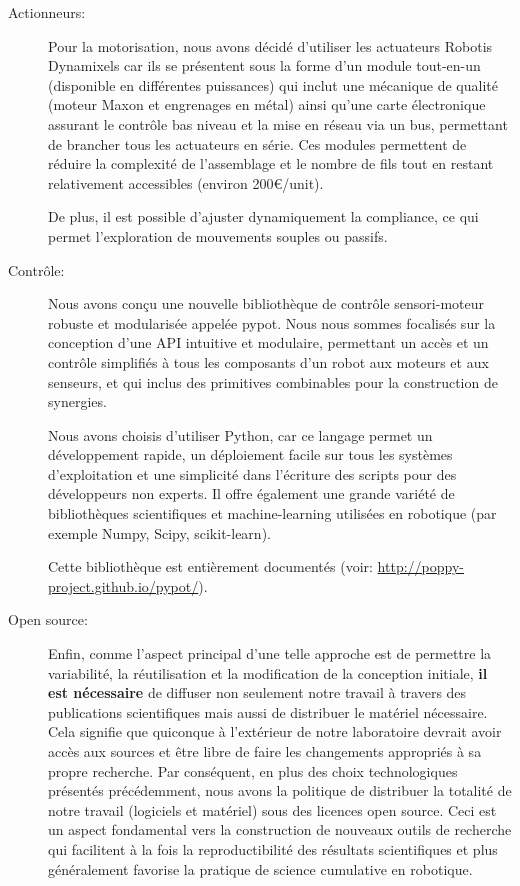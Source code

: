 \begin{description}
  \item[Actionneurs:] Pour la motorisation, nous avons décidé d'utiliser les actuateurs Robotis Dynamixels car ils se présentent sous la forme d'un module tout-en-un (disponible en différentes puissances) qui inclut une mécanique de qualité (moteur Maxon et engrenages en métal) ainsi qu'une carte électronique assurant le contrôle bas niveau et la mise en réseau via un bus, permettant de brancher tous les actuateurs en série. Ces modules permettent de réduire la complexité de l'assemblage et le nombre de fils tout en restant relativement accessibles (environ 200€/unit).

  De plus, il est possible d'ajuster dynamiquement la compliance, ce qui permet l'exploration de mouvements souples ou passifs.

  \item[Contrôle:] Nous avons conçu une nouvelle bibliothèque de contrôle sensori-moteur robuste et modularisée appelée pypot. Nous nous sommes focalisés sur la conception d'une API intuitive et modulaire, permettant un accès et un contrôle simplifiés à tous les composants d'un robot aux moteurs et aux senseurs, et qui inclus des primitives combinables pour la construction de synergies.

  Nous avons choisis d'utiliser Python, car ce langage permet un développement rapide, un déploiement facile sur tous les systèmes d'exploitation et une simplicité dans l'écriture des scripts pour des développeurs non experts. Il offre également une grande variété de bibliothèques scientifiques et machine-learning utilisées en robotique (par exemple Numpy, Scipy, scikit-learn).

  Cette bibliothèque est entièrement documentés (voir: \url{http://poppy-project.github.io/pypot/}).
  
  \item[Open source:] Enfin, comme l'aspect principal d'une telle approche est de permettre la variabilité, la réutilisation et la modification de la conception initiale, \textbf{il est nécessaire} de diffuser non seulement notre travail à travers des publications scientifiques mais aussi de distribuer le matériel nécessaire. 
  Cela signifie que quiconque à l'extérieur de notre laboratoire devrait avoir accès aux sources et être libre de faire les changements appropriés à sa propre recherche. Par conséquent, en plus des choix technologiques présentés précédemment, nous avons la politique de distribuer la totalité de notre travail (logiciels et matériel) sous des licences open source. Ceci est un aspect fondamental vers la construction de nouveaux outils de recherche qui facilitent à la fois la reproductibilité des résultats scientifiques et plus généralement favorise la pratique de science cumulative en robotique.


\end{description}
